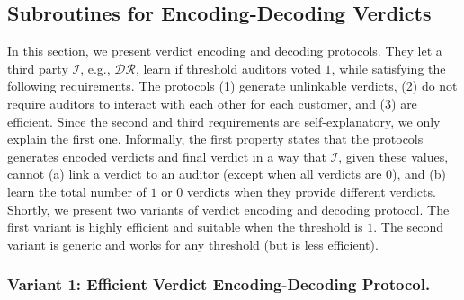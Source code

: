 
\vspace{.6mm}
\subsection{Subroutines for  Encoding-Decoding Verdicts}\label{sec::Encoding-Decoding-Verdicts}

\vspace{-1mm}

In this section, we present verdict encoding and decoding protocols. They let a third party $\mathcal{I}$, e.g., $\mathcal{DR}$, learn if threshold  auditors voted $1$, while satisfying the following  requirements.  The protocols  (1) generate unlinkable verdicts, (2) do not require auditors to interact with each other for each customer, and (3) are  efficient. Since the second and third requirements are self-explanatory,  we only explain the first one.  Informally, the first property states  that the protocols  generates encoded verdicts and final verdict in a way that $\mathcal{I}$,  given these values, cannot (a)   link a  verdict to an auditor (except when all verdicts are $0$), and (b) learn the total number of $1$ or $0$ verdicts when they provide different verdicts.  Shortly, we present two variants of verdict encoding and decoding protocol. The first variant is highly efficient and suitable when the threshold is $1$. The second variant is  generic and works for any threshold (but is  less efficient). 


\vspace{-1mm}
\subsubsection{Variant 1:  Efficient Verdict  Encoding-Decoding Protocol.}



